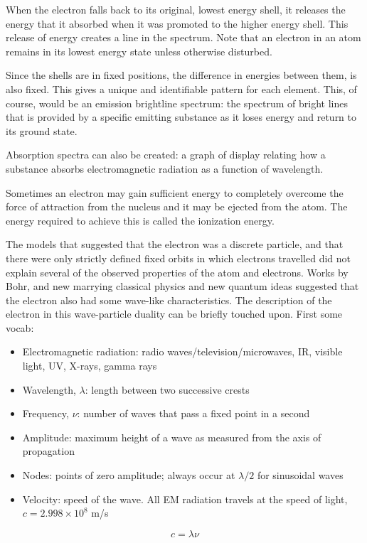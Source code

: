 \documentclass[../chem.tex]{subfiles}
\begin{document}
When the electron falls back to its original, lowest energy shell, it releases the energy that it absorbed when it was promoted to the higher energy shell.
This release of energy creates a line in the spectrum. Note that an electron in an atom remains in its lowest energy state unless otherwise disturbed.

Since the shells are in fixed positions, the difference in energies between them, is also fixed. This gives a unique and identifiable pattern for each element.
This, of course, would be an emission brightline spectrum: the spectrum of bright lines that is provided by a specific emitting substance as it loses energy and return to its ground state.

Absorption spectra can also be created: a graph of display relating how a substance absorbs electromagnetic radiation as a function of wavelength.

Sometimes an electron may gain sufficient energy to completely overcome the force of attraction from the nucleus and it may be ejected from the atom.
The energy required to achieve this is called the ionization energy. 

The models that suggested that the electron was a discrete particle, and that there were only strictly defined fixed orbits in which electrons travelled did not explain several of the observed properties of the atom and electrons.
Works by Bohr, and new marrying classical physics and new quantum ideas suggested that the electron also had some wave-like characteristics. The description of the electron in this wave-particle duality can be briefly touched upon.
First some vocab:
\begin{itemize}
    \item Electromagnetic radiation: radio waves/television/microwaves, IR, visible light, UV, X-rays, gamma rays
    \item Wavelength, $\lambda$: length between two successive crests 
    \item Frequency, $\nu$: number of waves that pass a fixed point in a second
    \item Amplitude: maximum height of a wave as measured from the axis of propagation
    \item Nodes: points of zero amplitude; always occur at $\lambda/2$ for sinusoidal waves
    \item Velocity: speed of the wave. All EM radiation travels at the speed of light, $c=2.998\times10^8$ m/s
\end{itemize}
\[c=\lambda \nu\]
\end{document}
